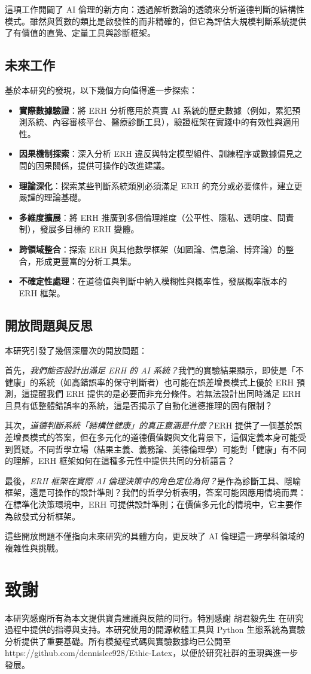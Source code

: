 \documentclass[12pt,a4paper]{article}
\theoremstyle{definition}
\theoremstyle{remark}
\begin{document}
這項工作開闢了 AI 倫理的新方向：透過解析數論的透鏡來分析道德判斷的結構性模式。雖然與質數的類比是啟發性的而非精確的，但它為評估大規模判斷系統提供了有價值的直覺、定量工具與診斷框架。

\subsection{未來工作}

基於本研究的發現，以下幾個方向值得進一步探索：

\begin{itemize}
    \item \textbf{實際數據驗證}：將 ERH 分析應用於真實 AI 系統的歷史數據（例如，累犯預測系統、內容審核平台、醫療診斷工具），驗證框架在實踐中的有效性與適用性。
    \item \textbf{因果機制探索}：深入分析 ERH 違反與特定模型組件、訓練程序或數據偏見之間的因果關係，提供可操作的改進建議。
    \item \textbf{理論深化}：探索某些判斷系統類別必須滿足 ERH 的充分或必要條件，建立更嚴謹的理論基礎。
    \item \textbf{多維度擴展}：將 ERH 推廣到多個倫理維度（公平性、隱私、透明度、問責制），發展多目標的 ERH 變體。
    \item \textbf{跨領域整合}：探索 ERH 與其他數學框架（如圖論、信息論、博弈論）的整合，形成更豐富的分析工具集。
    \item \textbf{不確定性處理}：在道德值與判斷中納入模糊性與概率性，發展概率版本的 ERH 框架。
\end{itemize}

\subsection{開放問題與反思}

本研究引發了幾個深層次的開放問題：

首先，\emph{我們能否設計出滿足 ERH 的 AI 系統？}我們的實驗結果顯示，即使是「不健康」的系統（如高錯誤率的保守判斷者）也可能在誤差增長模式上優於 ERH 預測，這提醒我們 ERH 提供的是必要而非充分條件。若無法設計出同時滿足 ERH 且具有低整體錯誤率的系統，這是否揭示了自動化道德推理的固有限制？

其次，\emph{道德判斷系統「結構性健康」的真正意涵是什麼？}ERH 提供了一個基於誤差增長模式的答案，但在多元化的道德價值觀與文化背景下，這個定義本身可能受到質疑。不同哲學立場（結果主義、義務論、美德倫理學）可能對「健康」有不同的理解，ERH 框架如何在這種多元性中提供共同的分析語言？

最後，\emph{ERH 框架在實際 AI 倫理決策中的角色定位為何？}是作為診斷工具、隱喻框架，還是可操作的設計準則？我們的哲學分析表明，答案可能因應用情境而異：在標準化決策環境中，ERH 可提供設計準則；在價值多元化的情境中，它主要作為啟發式分析框架。

這些開放問題不僅指向未來研究的具體方向，更反映了 AI 倫理這一跨學科領域的複雜性與挑戰。

\section*{致謝}

本研究感謝所有為本文提供寶貴建議與反饋的同行。特別感謝 胡君毅先生 在研究過程中提供的指導與支持。本研究使用的開源軟體工具與 Python 生態系統為實驗分析提供了重要基礎。所有模擬程式碼與實驗數據均已公開至https://github.com/dennislee928/Ethic-Latex，以便於研究社群的重現與進一步發展。



\end{document}
